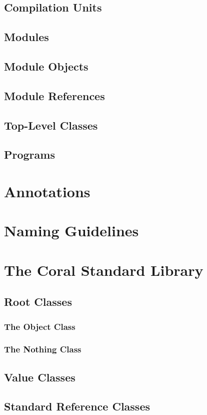 \section{Compilation Units}

\section{Modules}

\section{Module Objects}

\section{Module References}

\section{Top-Level Classes}

\section{Programs}

\chapter{Annotations}

\chapter{Naming Guidelines}

\chapter{The Coral Standard Library}

\section{Root Classes}

\subsection{The Object Class}

\subsection{The Nothing Class}

\section{Value Classes}

\section{Standard Reference Classes}



















